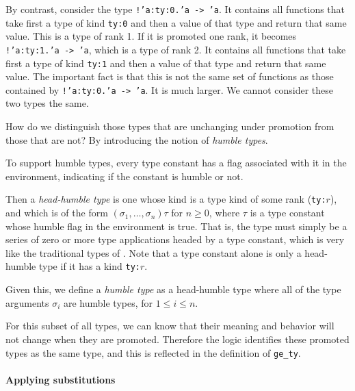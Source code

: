 By contrast, consider the type {\tt !'a:ty:0.'a~->~'a}. It contains all
functions that take first a type of kind {\tt ty:0}
and then a value of that type and return that same value.
This is a type of rank 1. If it is promoted one rank, it becomes
{\tt !'a:ty:1.'a~->~'a}, which is a type of rank 2.
It contains all functions that take first a type of kind {\tt ty:1}
and then a value of that type and return that same value.
The important fact is that this is not the same set of functions as
those contained by {\tt !'a:ty:0.'a~->~'a}. It is much larger.
We cannot consider these two types the same.

How do we distinguish those types that are unchanging
under promotion from those that are not? By introducing the 
notion of {\it humble types}.

To support humble types, every type constant has a flag associated
with it in the environment, indicating if the constant is humble or not.

Then a {\it head-humble type\/} is one whose kind is a type kind of
some rank ({\tt ty:}$r$),
and which is of the form
$(\sigma_1,\ldots,\sigma_n)\tau$ for $n \ge 0$, where $\tau$ is a type
constant whose humble flag in the environment is true.
That is, the type must simply be a series of zero or more 
type applications headed by a type constant, which is very 
like the traditional types of \HOL. Note that a type constant
alone is only a head-humble type if it has a kind {\tt ty:}$r$.

Given this, we define a {\it humble type\/} as a head-humble type
where all of the type arguments $\sigma_i$ are humble types,
for $1 \le i \le n$.

For this subset of all \HOLW{} types, we can know that their
meaning and behavior will not change when they are promoted.
Therefore the \HOLW{} logic identifies these promoted types 
as the same type, and this is reflected in the definition 
of {\tt ge\_ty}.

\paragraph{Applying substitutions}


